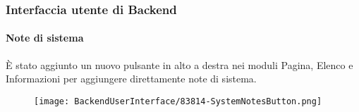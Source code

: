 %

\begin{frame}[fragile]
	\frametitle{Interfaccia utente di Backend}
	\framesubtitle{Note di sistema}

	È stato aggiunto un nuovo pulsante in alto a destra nei moduli Pagina, Elenco
	e Informazioni per aggiungere direttamente note di sistema.

	\begin{figure}
		\texttt{[image: BackendUserInterface/83814-SystemNotesButton.png]}
	\end{figure}

\end{frame}

